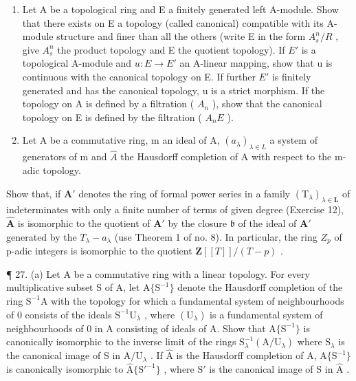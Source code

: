 \begin{enumerate}
\def\labelenumi{\arabic{enumi}.}
\setcounter{enumi}{24}
\item
  Let A be a topological ring and E a finitely generated left A-module. Show that there exists on E a topology (called canonical) compatible with its A-module structure and finer than all the others (write E in the form \(A_{s}^{n}/R\) , give \(A_{s}^{n}\) the product topology and E the quotient topology). If \(E'\) is a topological A-module and \(u: E \to E'\) an A-linear mapping, show that u is continuous with the canonical topology on E. If further \(E'\) is finitely generated and has the canonical topology, u is a strict morphism. If the topology on A is defined by a filtration ( \(A_{n}\) ), show that the canonical topology on E is defined by the filtration ( \(A_{n}E\) ).
\item
  Let A be a commutative ring, m an ideal of A, \((a_{\lambda})_{\lambda \in L}\) a system of generators of m and \(\hat{A}\) the Hausdorff completion of A with respect to the m-adic topology.
\end{enumerate}

Show that, if \(\mathbf{A}'\) denotes the ring of formal power series in a family \((\mathrm{T}_{\lambda})_{\lambda \in \mathbf{L}}\) of indeterminates with only a finite number of terms of given degree (Exercise 12), \(\hat{\mathbf{A}}\) is isomorphic to the quotient of \(\mathbf{A}'\) by the closure \(\mathfrak{b}\) of the ideal of \(\mathbf{A}'\) generated by the \(T_{\lambda} - a_{\lambda}\) (use Theorem 1 of no. 8). In particular, the ring \(Z_{p}\) of p-adic integers is isomorphic to the quotient \(\mathbf{Z}[[T]]/(T-p)\) .

¶ 27. (a) Let A be a commutative ring with a linear topology. For every multiplicative subset S of A, let \(\mathrm{A}\{\mathrm{S}^{-1}\}\) denote the Hausdorff completion of the ring \(\mathrm{S}^{-1}\mathrm{A}\) with the topology for which a fundamental system of neighbourhoods of 0 consists of the ideals \(\mathrm{S}^{-1}\mathrm{U}_{\lambda}\) , where \((\mathrm{U}_{\lambda})\) is a fundamental system of neighbourhoods of 0 in A consisting of ideals of A. Show that \(\mathrm{A}\{\mathrm{S}^{-1}\}\) is canonically isomorphic to the inverse limit of the rings \(\mathrm{S}_{\lambda}^{-1}(\mathrm{A}/\mathrm{U}_{\lambda})\) where \(\mathrm{S}_{\lambda}\) is the canonical image of S in \(\mathrm{A}/\mathrm{U}_{\lambda}\) . If \(\hat{\mathrm{A}}\) is the Hausdorff completion of A, \(\mathrm{A}\{\mathrm{S}^{-1}\}\) is canonically isomorphic to \(\hat{\mathrm{A}}\{\mathrm{S}'^{-1}\}\) , where \(\mathrm{S}'\) is the canonical image of S in \(\hat{\mathrm{A}}\) .

